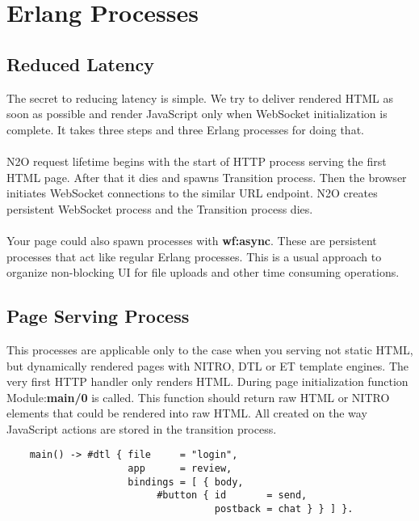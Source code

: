\section{Erlang Processes}

\subsection{Reduced Latency}
The secret to reducing latency is simple. We try to deliver rendered HTML
as soon as possible and render JavaScript only when WebSocket initialization is complete.
It takes three steps and three Erlang processes for doing that.


\paragraph{}
N2O request lifetime begins with the start of HTTP process serving the first HTML page.
After that it dies and spawns Transition process.
Then the browser initiates WebSocket connections to the similar URL endpoint.
N2O creates persistent WebSocket process and the Transition process dies.

\paragraph{}
Your page could also spawn processes with {\bf wf:async}.
These are persistent processes that act like regular Erlang processes.
This is a usual approach to organize non-blocking UI for file uploads
and other time consuming operations.

\newpage
\subsection{Page Serving Process}
This processes are applicable only to the case when you serving not static HTML,
but dynamically rendered pages with NITRO, DTL or ET template engines.
The very first HTTP handler only renders HTML. During page initialization
function Module:{\bf main/0} is called. This function should return raw HTML or
NITRO elements that could be rendered into raw HTML. All created on the way
JavaScript actions are stored in the transition process.

\vspace{1\baselineskip}
\begin{lstlisting}
    main() -> #dtl { file     = "login",
                     app      = review,
                     bindings = [ { body,
                          #button { id       = send,
                                    postback = chat } } ] }.
\end{lstlisting}
\vspace{1\baselineskip}

